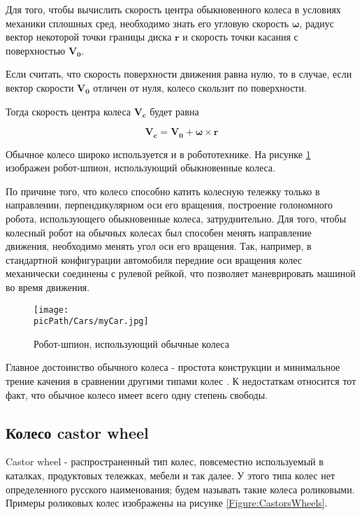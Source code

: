 \documentclass[oneside,final,14pt]{extreport}
\newcommand{\picPath}{img}
\newcommand{\cmmnt}[1]{\ignorespaces}
\newcommand{\bs}{\boldsymbol}
\begin{document}
Для того, чтобы вычислить скорость центра обыкновенного колеса в условиях механики сплошных сред, необходимо знать его угловую скорость $\bs{\omega}$, радиус вектор некоторой точки границы диска $\bs{r}$ и скорость точки касания с поверхностью $\bs{V_{0}}$.

Если считать, что скорость поверхности движения равна нулю, то в случае, если вектор скорости $\bs{V_{0}}$ отличен от нуля, колесо скользит по поверхности. 

Тогда скорость центра колеса $\bs{V_{c}}$ будет равна

\begin{equation}
\bs{V_{c}}
=
\bs{V_{0}}
+
\bs{\omega}
\times
\bs{r}
\label{Equation:wheelSpeed}
\end{equation}

Обычное колесо широко используется и в робототехнике. На рисунке \ref{Figure:myCar} изображен робот-шпион, использующий обыкновенные колеса. 

По причине того, что  колесо способно катить колесную тележку только в направлении, перпендикулярном оси его вращения, построение голономного робота, использующего обыкновенные колеса, затруднительно. Для того, чтобы колесный робот на обычных колесах был способен менять направление движения, необходимо менять угол оси его вращения. Так, например, в стандартной конфигурации автомобиля передние оси вращения колес механически соединены с рулевой рейкой, что позволяет маневрировать машиной во время движения.  
\begin{figure}[H]
\begin{center}
\texttt{[image: \\picPath/Cars/myCar.jpg]}
\end{center}
  \caption{ Робот-шпион, использующий обычные колеса}
  \label{Figure:myCar}
\end{figure}
Главное достоинство обычного колеса - простота конструкции и минимальное трение качения в сравнении другими типами колес \cite{WheelCmp}. К недостаткам относится тот факт, что обычное колесо имеет всего одну степень свободы. \cmmnt{движение обычного колеса возможно только в направлениях, перпендикулярных оси вращения.}
\subsection{Колесо castor wheel}
Castor wheel - распространенный тип колес, повсеместно используемый в каталках, продуктовых тележках, мебели и так далее. У этого типа колес нет определенного русского наименования; будем называть такие колеса роликовыми. Примеры роликовых колес изображены на рисунке \ref{Figure:CastorsWheels}.
\end{document}
